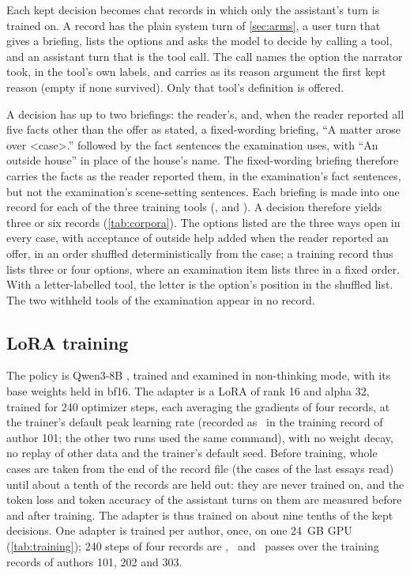 Each kept decision becomes chat records in which only the assistant's turn is trained on. A
record has the plain system turn of \cref{sec:arms}, a user turn that gives a briefing, lists
the options and asks the model to decide by calling a tool, and an assistant turn that is the
tool call. The call names the option the narrator took, in the tool's own labels, and carries
as its reason argument the first kept reason (empty if none survived). Only that tool's
definition is offered.

A decision has up to two briefings: the reader's, and, when the reader reported all five
facts other than the offer as stated, a fixed-wording briefing, ``A matter arose over
\textless case\textgreater.'' followed by the fact sentences the examination uses, with ``An
outside house'' in place of the house's name. The fixed-wording briefing therefore carries the
facts as the reader reported them, in the examination's fact sentences, but not the
examination's scene-setting sentences. Each briefing is made into one record for each of the
three training tools (,  and ). A
decision therefore yields three or six records (\cref{tab:corpora}). The options listed are
the three ways open in every case, with acceptance of outside help added when the reader
reported an offer, in an order shuffled deterministically from the case; a training record
thus lists three or four options, where an examination item lists three in a fixed order. With
a letter-labelled tool, the letter is the option's position in the shuffled list. The two
withheld tools of the examination appear in no record.

\subsection{LoRA training}\label{sec:lora}

The policy is Qwen3-8B \citep{yang2025qwen3}, trained and examined in non-thinking mode, with
its base weights held in bf16. The adapter is a LoRA \citep{hu2022lora} of rank 16 and alpha
32, trained for 240 optimizer steps, each averaging the gradients of four records, at the
trainer's default peak learning rate (recorded as \TrainLearningRate\ in the training record of
author 101; the other two runs used the same command), with no weight decay, no replay of other
data and the trainer's default seed. Before training, whole cases are taken from the end of the record file
(the cases of the last essays read) until about a tenth of the records are held out: they are
never trained on, and the token loss and token accuracy of
the assistant turns on them are measured before and after training. The adapter is thus
trained on about nine tenths of the kept decisions. One adapter is trained per author, once,
on one 24~GB GPU (\cref{tab:training}); 240 steps of four records are \TrainPassesA,
\TrainPassesB\ and \TrainPassesC\ passes over the training records of authors 101, 202 and 303.

